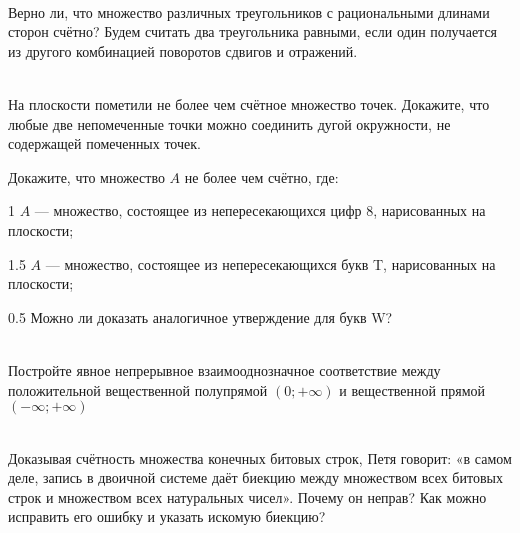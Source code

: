 \documentclass[a4paper,12pt,twoside]{article}
\begin{document}
\begin{?}\ \\
     Верно ли, что множество различных треугольников с рациональными длинами сторон счётно? Будем считать два треугольника равными, если один получается из другого комбинацией поворотов сдвигов и отражений.
\end{?}
\begin{?}\ \\
     На плоскости пометили не более чем счётное множество точек. Докажите, что любые две непомеченные точки можно соединить дугой окружности, не содержащей помеченных точек.
\end{?}
\begin{?}
    Докажите, что множество $A$ не более чем счётно, где:
    \begin{tasklist}
        \item[1] $A$ --- множество, состоящее из непересекающихся цифр 8, нарисованных
        на плоскости;
        \item[1.5] $A$ --- множество, состоящее из непересекающихся букв T, нарисованных на плоскости;
        \item[0.5] Можно ли доказать аналогичное утверждение для букв W?
    \end{tasklist}
\end{?}
\begin{?}\ \\
     Постройте явное непрерывное взаимооднозначное соответствие между положительной вещественной полупрямой $(0; +\infty)$ и вещественной прямой $(-\infty; +\infty)$
\end{?} 
\begin{?}\ \\
     Доказывая счётность множества конечных битовых строк, Петя говорит: «в самом деле, запись в двоичной системе даёт биекцию между множеством всех битовых строк и множеством всех натуральных чисел». Почему он неправ? Как можно исправить его ошибку и указать искомую биекцию?
\end{?}
\end{document}
